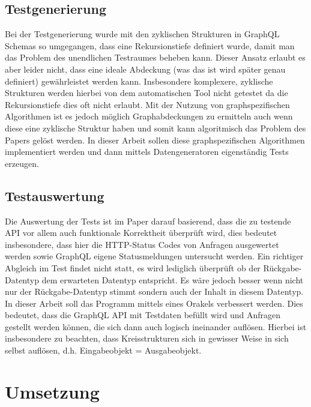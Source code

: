 \subsection{Testgenerierung}

Bei der Testgenerierung wurde mit den zyklischen Strukturen in GraphQL Schemas so
umgegangen, dass eine Rekursionstiefe definiert wurde, damit man das Problem des unendlichen Testraumes beheben kann.
Dieser Ansatz erlaubt es aber leider nicht, dass eine ideale Abdeckung (was das ist wird später genau
definiert) gewährleistet werden kann.
Insbesondere komplexere, zyklische Strukturen werden hierbei von dem automatischen
Tool nicht getestet da die Rekursionstiefe dies oft nicht erlaubt.
Mit der Nutzung von graphspezifischen Algorithmen ist es jedoch möglich Graphabdeckungen zu ermitteln auch wenn diese
eine zyklische Struktur haben und somit kann algoritmisch das Problem des Papers gelöst werden.
In dieser Arbeit sollen diese graphspezifischen Algorithmen implementiert werden und dann mittels Datengeneratoren eigenständig
Tests erzeugen.

\subsection{Testauswertung}

Die Auswertung der Tests ist im Paper darauf basierend, dass die zu testende API vor allem auch funktionale Korrektheit überprüft wird,
dies bedeutet insbesondere, dass hier die HTTP-Status Codes von Anfragen ausgewertet werden sowie GraphQL eigene Statusmeldungen untersucht werden.
Ein richtiger Abgleich im Test findet nicht statt, es wird lediglich überprüft ob der Rückgabe-Datentyp dem erwarteten Datentyp entspricht.
Es wäre jedoch besser wenn nicht nur der Rückgabe-Datentyp stimmt sondern auch der Inhalt in diesem Datentyp. In dieser Arbeit
soll das Programm mittels eines Orakels verbessert werden. Dies bedeutet, dass die GraphQL API mit Testdaten befüllt wird und Anfragen
gestellt werden können, die sich dann auch logisch ineinander auflösen. Hierbei ist insbesondere zu beachten, dass Kreisstrukturen sich in gewisser Weise
in sich selbst auflösen, d.h. Eingabeobjekt = Ausgabeobjekt.

\section{Umsetzung}

